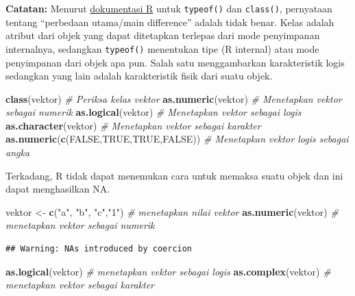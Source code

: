 \documentclass[
]{book}
\newenvironment{Shaded}{\begin{snugshade}}{\end{snugshade}}
\newcommand{\CommentTok}[1]{\textcolor[rgb]{0.56,0.35,0.01}{\textit{#1}}}
\newcommand{\ConstantTok}[1]{\textcolor[rgb]{0.56,0.35,0.01}{#1}}
\newcommand{\FunctionTok}[1]{\textcolor[rgb]{0.13,0.29,0.53}{\textbf{#1}}}
\newcommand{\NormalTok}[1]{#1}
\newcommand{\OtherTok}[1]{\textcolor[rgb]{0.56,0.35,0.01}{#1}}
\newcommand{\StringTok}[1]{\textcolor[rgb]{0.31,0.60,0.02}{#1}}
\begin{document}
\textbf{Catatan:} Menurut \href{https://stat.ethz.ch/R-manual/R-devel/doc/manual/R-lang.html\#Objects}{dokumentasi R} untuk \texttt{typeof()} dan \texttt{class()}, pernyataan tentang ``perbedaan utama/main difference'' adalah tidak benar. Kelas adalah atribut dari objek yang dapat ditetapkan terlepas dari mode penyimpanan internalnya, sedangkan \texttt{typeof()} menentukan tipe (R internal) atau mode penyimpanan dari objek apa pun. Salah satu menggambarkan karakteristik logis sedangkan yang lain adalah karakteristik fisik dari suatu objek.

\begin{Shaded}
\begin{Highlighting}[]
\FunctionTok{class}\NormalTok{(vektor)                            }\CommentTok{\# Periksa kelas vektor}
\FunctionTok{as.numeric}\NormalTok{(vektor)                       }\CommentTok{\# Menetapkan vektor sebagai numerik}
\FunctionTok{as.logical}\NormalTok{(vektor)                       }\CommentTok{\# Menetapkan vektor sebagai logis}
\FunctionTok{as.character}\NormalTok{(vektor)                     }\CommentTok{\# Menetapkan vektor sebagai karakter}
\FunctionTok{as.numeric}\NormalTok{(}\FunctionTok{c}\NormalTok{(}\ConstantTok{FALSE}\NormalTok{,}\ConstantTok{TRUE}\NormalTok{,}\ConstantTok{TRUE}\NormalTok{,}\ConstantTok{FALSE}\NormalTok{))     }\CommentTok{\# Menetapkan vektor logis sebagai angka }
\end{Highlighting}
\end{Shaded}

Terkadang, R tidak dapat menemukan cara untuk memaksa suatu objek dan ini dapat menghasilkan NA.

\begin{Shaded}
\begin{Highlighting}[]
\NormalTok{vektor }\OtherTok{\textless{}{-}} \FunctionTok{c}\NormalTok{(}\StringTok{"a"}\NormalTok{, }\StringTok{"b"}\NormalTok{, }\StringTok{"c"}\NormalTok{,}\StringTok{"1"}\NormalTok{)             }\CommentTok{\# menetapkan nilai vektor}
\FunctionTok{as.numeric}\NormalTok{(vektor)                       }\CommentTok{\# menetapkan vektor sebagai numerik}
\end{Highlighting}
\end{Shaded}

\begin{verbatim}
## Warning: NAs introduced by coercion
\end{verbatim}

\begin{Shaded}
\begin{Highlighting}[]
\FunctionTok{as.logical}\NormalTok{(vektor)                       }\CommentTok{\# menetapkan vektor sebagai logis}
\FunctionTok{as.complex}\NormalTok{(vektor)                       }\CommentTok{\# menetapkan vektor sebagai karakter}
\end{Highlighting}
\end{Shaded}
\end{document}

